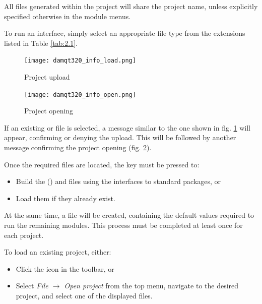 \documentclass[10pt]{article}
\begin{document}
All files generated within the project will share the project name,
unless explicitly specified otherwise in the module menus.

To run an interface, simply select an appropriate file type
from the extensions listed in Table \ref{tab:2.1}.
 

\begin{center}
\begin{minipage}{.25\linewidth}
\begin{figure}[H]
\begin{center}
\vspace*{-2mm}
\texttt{[image: damqt320\_info\_load.png]}
\end{center}
\caption{Project upload \label{fig:2_1_3}}
\end{figure}
\end{minipage}
\begin{minipage}{.25\linewidth}
\begin{figure}[H]
\begin{center}
\vspace*{-2mm}
\texttt{[image: damqt320\_info\_open.png]}
\end{center}
\caption{Project opening\label{fig:2_1_4}}
\end{figure}
\end{minipage}
\end{center}

If an existing \ggbs{ } or \sgbs{ } file is selected, a message
similar to the one shown in fig. \ref{fig:2_1_3} will appear, confirming or denying the upload.
This will be followed by another message confirming the project opening (fig. \ref{fig:2_1_4}).

Once the required files are located, the \exec key must be pressed to:
\begin{itemize}
\item Build the \ggbs{ } (\sgbs{ }) and \den{ } files using the interfaces to standard packages, or
\item Load them if they already exist.
\end{itemize}

At the same time, a \damproj{ } file will be created,
containing the default values required to run the remaining modules.
This process must be completed at least once for each project.

To load an existing project, either:
\begin{itemize}
\item Click the \toolbA icon in the toolbar, or
\item Select {\it File $\rightarrow$ Open project} from the top menu,
navigate to the desired project, and select one of the displayed files.
\end{itemize}
\end{document}
